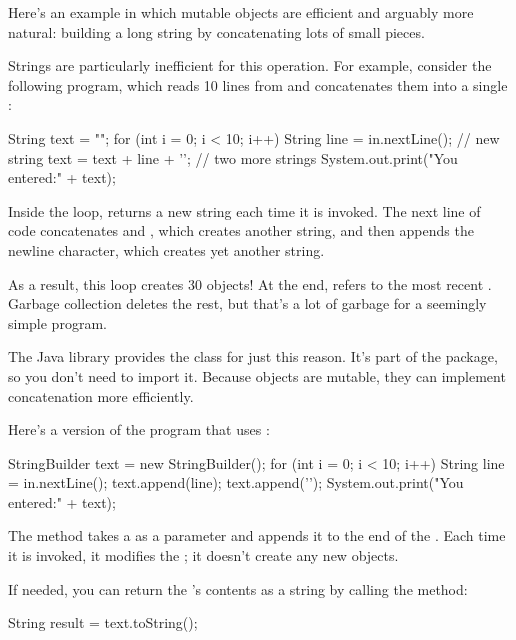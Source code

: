 Here's an example in which mutable objects are efficient and arguably more natural: building a long string by concatenating lots of small pieces.

Strings are particularly inefficient for this operation.
For example, consider the following program, which reads 10 lines from  and concatenates them into a single :

\begin{code}
String text = "";
for (int i = 0; i < 10; i++) {
    String line = in.nextLine();        // new string
    text = text + line + '\n';    // two more strings
}
System.out.print("You entered:\n" + text);
\end{code}

Inside the  loop,  returns a new string each time it is invoked.
The next line of code concatenates  and , which creates another string, and then appends the newline character, which creates yet another string.

As a result, this loop creates 30  objects!
At the end,  refers to the most recent .
Garbage collection deletes the rest, but that's a lot of garbage for a seemingly simple program.


The Java library provides the  class for just this reason.
It's part of the  package, so you don't need to import it.
Because  objects are mutable, they can implement concatenation more efficiently.

Here's a version of the program that uses :

\begin{code}
StringBuilder text = new StringBuilder();
for (int i = 0; i < 10; i++) {
    String line = in.nextLine();
    text.append(line);
    text.append('\n');
}
System.out.print("You entered:\n" + text);
\end{code}

The  method takes a  as a parameter and appends it to the end of the .
Each time it is invoked, it modifies the ; it doesn't create any new objects.

If needed, you can return the 's contents as a string by calling the  method:

\begin{code}
String result = text.toString();
\end{code}

